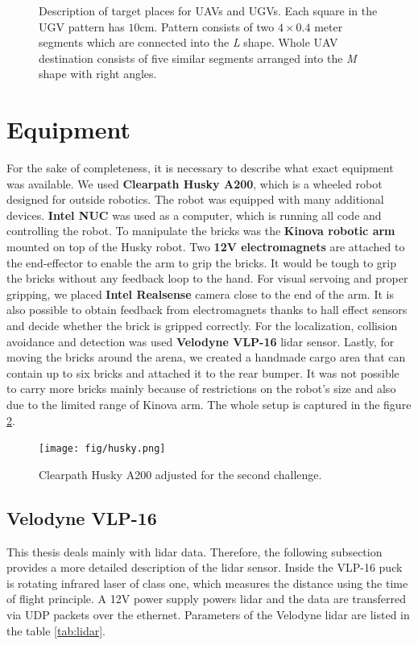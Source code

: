 \begin{figure}[H]
\caption[Brick destinations]{Description of target places for UAVs and UGVs. Each square in the UGV pattern has $10$cm. Pattern consists of two $4\times0.4$ meter segments which are connected into the \textit{L} shape. Whole UAV destination consists of five similar segments arranged into the \textit{M} shape with right angles.}
\label{fig:dest}
\end{figure}


\section{Equipment}
For the sake of completeness, it is necessary to describe what exact equipment was available. We used \textbf{Clearpath Husky A200}, which is a wheeled robot designed for outside robotics. The robot was equipped with many additional devices. \textbf{Intel NUC} was used as a computer, which is running all code and controlling the robot. To manipulate the bricks was the \textbf{Kinova robotic arm} mounted on top of the Husky robot. Two \textbf{12V electromagnets} are attached to the end-effector to enable the arm to grip the bricks. It would be tough to grip the bricks without any feedback loop to the hand. For visual servoing and proper gripping, we placed \textbf{Intel Realsense} camera close to the end of the arm. It is also possible to obtain feedback from electromagnets thanks to hall effect sensors and decide whether the brick is gripped correctly. For the localization, collision avoidance and detection was used \textbf{Velodyne VLP-16} lidar sensor. Lastly, for moving the bricks around the arena, we created a handmade cargo area that can contain up to six bricks and attached it to the rear bumper. It was not possible to carry more bricks mainly because of restrictions on the robot's size and also due to the limited range of Kinova arm. The whole setup is captured in the figure \ref{fig:husky}.

\begin{figure}[H]
\centering
\texttt{[image: fig/husky.png]}
\caption[UGV robot setup]{Clearpath Husky A200 adjusted for the second challenge.}
\label{fig:husky}

\end{figure}

\subsection{Velodyne VLP-16}
This thesis deals mainly with lidar data. Therefore, the following subsection provides a more detailed description of the lidar sensor. Inside the VLP-16 puck is rotating infrared laser of class one, which measures the distance using the time of flight principle. A 12V power supply powers lidar and the data are transferred via UDP packets over the ethernet. Parameters of the Velodyne lidar are listed in the table \ref{tab:lidar}.

